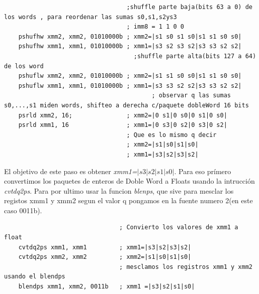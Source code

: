 \begin{codesnippet}
\begin{verbatim}
                                  ;shuffle parte baja(bits 63 a 0) de los words , para reordenar las sumas s0,s1,s2ys3
                                  ; imm8 = 1 1 0 0
    pshufhw xmm2, xmm2, 01010000b ; xmm2=|s1 s0 s1 s0|s1 s1 s0 s0| 
    pshufhw xmm1, xmm1, 01010000b ; xmm1=|s3 s2 s3 s2|s3 s3 s2 s2|
                                    ;shuffle parte alta(bits 127 a 64) de los word
    pshuflw xmm2, xmm2, 01010000b ; xmm2=|s1 s1 s0 s0|s1 s1 s0 s0|
    pshuflw xmm1, xmm1, 01010000b ; xmm1=|s3 s3 s2 s2|s3 s3 s2 s2|
                                         ; observar q las sumas s0,...,s1 miden words, shifteo a derecha c/paquete dobleWord 16 bits
    psrld xmm2, 16;               ; xmm2=|0 s1|0 s0|0 s1|0 s0| 
    psrld xmm1, 16                ; xmm1=|0 s3|0 s2|0 s3|0 s2| 
								  ; Que es lo mismo q decir
                                  ; xmm2=|s1|s0|s1|s0|
                                  ; xmm1=|s3|s2|s3|s2|
\end{verbatim}
\end{codesnippet}

El objetivo de este paso es obtener \emph{xmm1=$|s3|s2|s1|s0|$}. Para eso prímero convertimos los paquetes de enteros de Doble Word a Floats usando la intrucción \emph{cvtdq2ps}. Para por ultimo usar la funcion \emph{blenps}, que sive para mesclar los registos xmm1 y xmm2 segun el valor q pongamos en la fuente numero 2(en este caso 0011b).
\begin{codesnippet}
\begin{verbatim}
                                ; Convierto los valores de xmm1 a float
    cvtdq2ps xmm1, xmm1         ; xmm1=|s3|s2|s3|s2|
    cvtdq2ps xmm2, xmm2         ; xmm2=|s1|s0|s1|s0|
                                ; mesclamos los registros xmm1 y xmm2 usando el blendps
    blendps xmm1, xmm2, 0011b   ; xmm1 =|s3|s2|s1|s0|
\end{verbatim}
\end{codesnippet}

